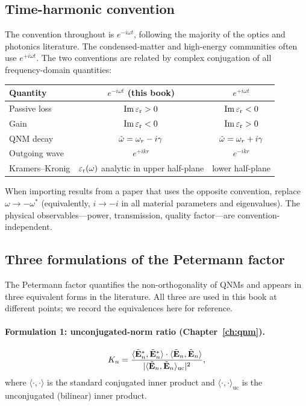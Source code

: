\subsection{Time-harmonic convention}
\label{ssec:time-convention}

The convention throughout is $e^{-i\omega t}$, following the majority of the
optics and photonics literature. The condensed-matter and high-energy
communities often use $e^{+i\omega t}$. The two conventions are
related by complex conjugation of all frequency-domain quantities:
\begin{center}
\begin{tabular}{lcc}
 \toprule
 \textbf{Quantity} & $e^{-i\omega t}$ (this book) & $e^{+i\omega t}$ \\
 \midrule
 Passive loss & $\operatorname{Im}\varepsilon_{\mathrm{r}} > 0$ & $\operatorname{Im}\varepsilon_{\mathrm{r}} < 0$ \\
 Gain & $\operatorname{Im}\varepsilon_{\mathrm{r}} < 0$ & $\operatorname{Im}\varepsilon_{\mathrm{r}} > 0$ \\
 QNM decay & $\tilde{\omega} = \omega_r - i\gamma$ & $\tilde{\omega} = \omega_r + i\gamma$ \\
 Outgoing wave & $e^{+ikr}$ & $e^{-ikr}$ \\
 Kramers--Kronig & $\varepsilon_{\mathrm{r}}(\omega)$ analytic in upper half-plane & lower half-plane \\
 \bottomrule
\end{tabular}
\end{center}
When importing results from a paper that uses the opposite convention,
replace $\omega \to -\omega^*$ (equivalently, $i \to -i$ in all
material parameters and eigenvalues). The physical observables---power,
transmission, quality factor---are convention-independent.

\subsection{Three formulations of the Petermann factor}
\label{ssec:petermann-conventions}

The Petermann factor quantifies the non-orthogonality of QNMs and
appears in three equivalent forms in the literature. All three are
used in this book at different points; we record the equivalences here
for reference.

\paragraph{Formulation 1: unconjugated-norm ratio
(Chapter~\ref{ch:qnm}).}
\begin{equation}
 K_n = \frac{
 \langle \tilde{\mathbf{E}}_n^*, \tilde{\mathbf{E}}_n^* \rangle
 \cdot
 \langle \tilde{\mathbf{E}}_n, \tilde{\mathbf{E}}_n \rangle
 }{
 |\langle \tilde{\mathbf{E}}_n, \tilde{\mathbf{E}}_n \rangle_{\mathrm{uc}}|^2
 },
 \label{eq:petermann-form1}
\end{equation}
where $\langle\cdot,\cdot\rangle$ is the standard conjugated inner
product and $\langle\cdot,\cdot\rangle_{\mathrm{uc}}$ is the
unconjugated (bilinear) inner product.

